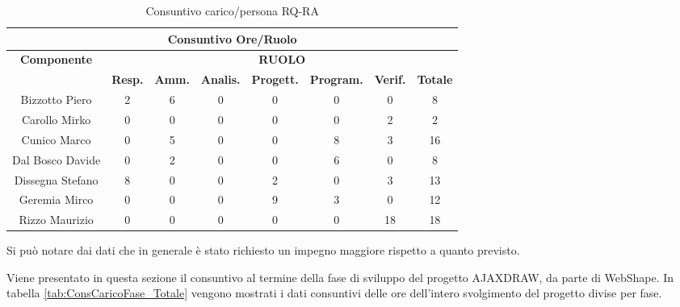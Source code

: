 \begin{table}[!h]
	\begin{center}
		  \begin{tabular}
			  {|c|c|c|c|c|c|c|c|}
		 \hline
			\multicolumn{8}{|c|}{ \textbf{Consuntivo Ore/Ruolo} } \\
			\hline
			\textbf{Componente} & \multicolumn{7}{|c|}{ \textbf{RUOLO} } \\
			\hline
			& \textbf{Resp.} & \textbf{Amm.} & \textbf{Analis.} & \textbf{Progett.} & \textbf{Program.} & \textbf{Verif.}  & \textbf{Totale}\\
			\hline
			Bizzotto Piero 		&  2  &  6  &  0  &  0  &  0 &  0 &  8 \\ %
			\hline
			Carollo Mirko 		&  0  &  0  &  0 &  0  &  0 &  2 &  2\\ %
			\hline
			Cunico Marco    	&  0  &  5 &  0  &  0 &  8 &  3  &  16\\ %
			\hline
			Dal Bosco Davide   	&  0  &  2  &  0  &  0 &  6 &  0 &  8\\ %
			\hline
			Dissegna Stefano    &  8  &  0 &  0  &  2 &  0 &  3  &  13\\ %
			\hline
			Geremia Mirco   	&  0  &  0  &  0  &  9 &  3 &  0  &  12\\ %
			\hline	
			Rizzo Maurizio  	&  0  &  0 &  0  &  0  &  0 &  18  &  18\\ %
			\hline	
		\end{tabular}
	\caption{Consuntivo carico/persona RQ-RA} %
	\label{tab: ConsPersOre_RPP-RQ}
	\end{center}	
\end{table}

Si pu\`o notare dai dati che in generale \`e stato richiesto un impegno maggiore rispetto a quanto previsto.

\newpage
{}
Viene presentato in questa sezione il consuntivo al termine della fase
di sviluppo del progetto AJAXDRAW, da parte di WebShape. In tabella \ref{tab:ConsCaricoFase_Totale} vengono mostrati i dati consuntivi delle ore dell'intero svolgimento
del progetto divise per fase.

